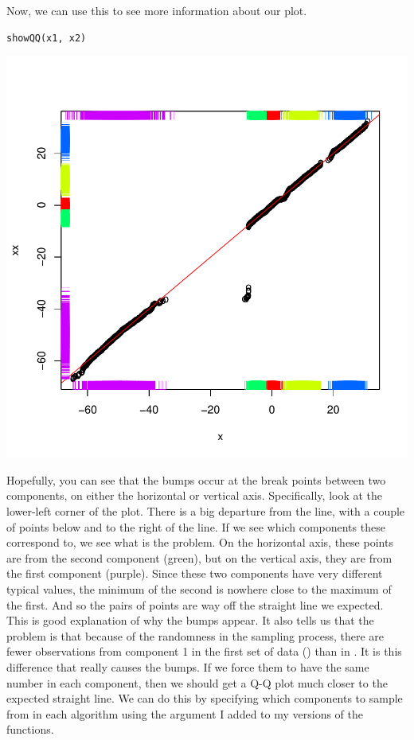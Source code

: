 \documentclass{article}
\begin{document}
\begin{description}
Now, we can use this to see more information about our plot.
\begin{verbatim}
showQQ(x1, x2)
\end{verbatim}
\includegraphics{images/algorithmRugQQ.pdf}

Hopefully, you can see that the bumps occur at the break points
between two components, on either the horizontal or vertical axis.
Specifically, look at the lower-left corner of the plot.  There is a
big departure from the line, with a couple of points below and to the
right of the line.  If we see which components these correspond to, we
see what is the problem.  On the horizontal axis, these points are
from the second component (green), but on the vertical axis, they are
from the first component (purple).  Since these two components have
very different typical values, the minimum of the second is nowhere
close to the maximum of the first.  And so the pairs of points are way
off the straight line we expected.  This is good explanation of why
the bumps appear.  It also tells us that the problem is that because
of the randomness in the sampling process, there are fewer
observations from component 1 in the first set of data
() than in .  It is this difference that
really causes the bumps.  If we force them to have the same number in
each component, then we should get a Q-Q plot much closer to the
expected straight line.  We can do this by specifying which components
to sample from in each algorithm using the 
argument I added to my versions of the functions.


\end{description}
\end{document}
